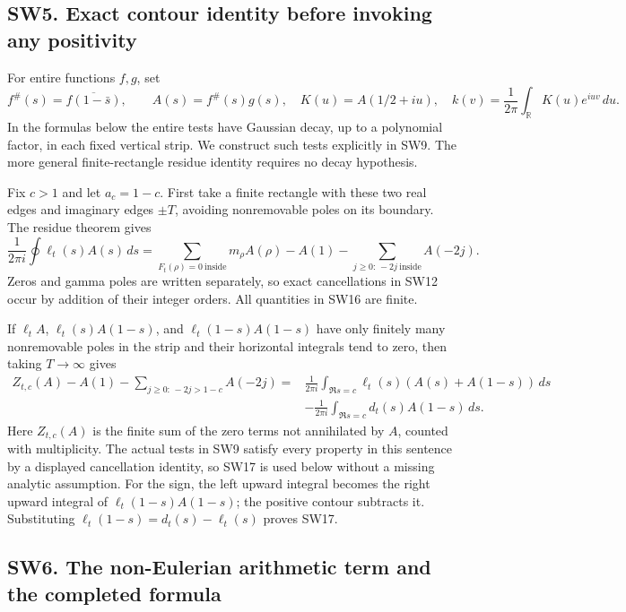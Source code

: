\documentclass[
  10pt,
  a4paper,
]{article}
\begin{document}
\subsection{SW5. Exact contour identity before invoking any
positivity}\label{sw5.-exact-contour-identity-before-invoking-any-positivity}

For entire functions \(f,g\), set \[
f^\#(s)=\overline{f(1-\bar s)},\qquad A(s)=f^\#(s)g(s),
\quad K(u)=A(1/2+iu),\quad
k(v)=\frac1{2\pi}\int_{\mathbb R}K(u)e^{iuv}\,du.
\tag{SW15}
\] In the formulas below the entire tests have Gaussian decay, up to a
polynomial factor, in each fixed vertical strip. We construct such tests
explicitly in SW9. The more general finite-rectangle residue identity
requires no decay hypothesis.

Fix \(c>1\) and let \(a_c=1-c\). First take a finite rectangle with
these two real edges and imaginary edges \(\pm T\), avoiding
nonremovable poles on its boundary. The residue theorem gives \[
\frac1{2\pi i}\oint\ell_t(s)A(s)\,ds
=\sum_{F_t(\rho)=0\ \mathrm{inside}}m_\rho A(\rho)
-A(1)-\sum_{j\ge0:\,-2j\ \mathrm{inside}}A(-2j).
\tag{SW16}
\] Zeros and gamma poles are written separately, so exact cancellations
in SW12 occur by addition of their integer orders. All quantities in
SW16 are finite.

If \(\ell_t A\), \(\ell_t(s)A(1-s)\), and \(\ell_t(1-s)A(1-s)\) have
only finitely many nonremovable poles in the strip and their horizontal
integrals tend to zero, then taking \(T\to\infty\) gives \[
\begin{aligned}
Z_{t,c}(A)-A(1)-\sum_{j\ge0:\,-2j>1-c}A(-2j)
={}&\frac1{2\pi i}\int_{\Re s=c}
\ell_t(s)(A(s)+A(1-s))\,ds\\
&-\frac1{2\pi i}\int_{\Re s=c}d_t(s)A(1-s)\,ds.
\end{aligned}
\tag{SW17}
\] Here \(Z_{t,c}(A)\) is the finite sum of the zero terms not
annihilated by \(A\), counted with multiplicity. The actual tests in SW9
satisfy every property in this sentence by a displayed cancellation
identity, so SW17 is used below without a missing analytic assumption.
For the sign, the left upward integral becomes the right upward integral
of \(\ell_t(1-s)A(1-s)\); the positive contour subtracts it.
Substituting \(\ell_t(1-s)=d_t(s)-\ell_t(s)\) proves SW17.

\subsection{SW6. The non-Eulerian arithmetic term and the completed
formula}\label{sw6.-the-non-eulerian-arithmetic-term-and-the-completed-formula}
\end{document}
